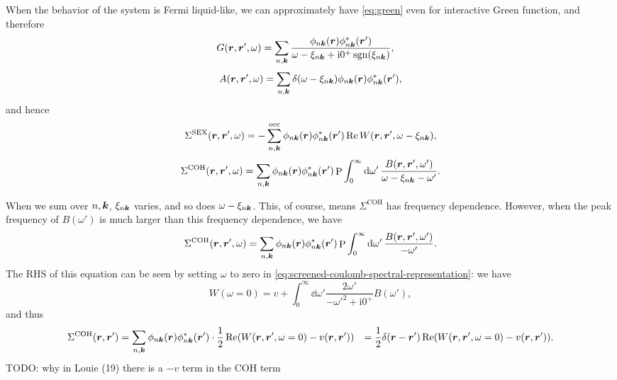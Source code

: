 \documentclass[hyperref, a4paper, 12pt]{report}
\DeclareMathOperator{\primevalue}{P}
\DeclareMathOperator{\sgn}{sgn}
\newcommand*{\ii}{\mathrm{i}}
\def\\{}%
\begin{document}
When the behavior of the system is Fermi liquid-like, 
we can approximately have \eqref{eq:green} even for interactive Green function,
and therefore 
\begin{equation}
    G(\vb*{r}, \vb*{r}', \omega)
    = \sum_{n, \vb*{k}} \frac{
        \phi_{n \vb*{k}}(\vb*{r}) \phi^*_{n \vb*{k}}(\vb*{r}')
    }{
        \omega - \xi_{n \vb*{k}} + \ii 0^+ \sgn(\xi_{n \vb*{k}})
    }, \quad 
\end{equation}
\begin{equation}
    A(\vb*{r}, \vb*{r}', \omega)
    = \sum_{n, \vb*{k}} \delta(\omega - \xi_{n \vb*{k}})
    \phi_{n \vb*{k}}(\vb*{r}) \phi^*_{n \vb*{k}}(\vb*{r}'),
\end{equation}
and hence 
\begin{equation}
    \Sigma^{\text{SEX}}(\vb*{r}, \vb*{r}', \omega)
    = - \sum_{n, \vb*{k}}^{\text{occ}}
    \phi_{n \vb*{k}}(\vb*{r}) \phi_{n \vb*{k}}^*(\vb*{r}') 
    \Re W(\vb*{r}, \vb*{r}', \omega - \xi_{n \vb*{k}}), 
    \label{eq:sigma-sex-fermi-liquid}
\end{equation}
\begin{equation}
    \Sigma^{\text{COH}}(\vb*{r}, \vb*{r}', \omega)
    = \sum_{n, \vb*{k}} \phi_{n \vb*{k}}(\vb*{r}) \phi_{n \vb*{k}}^*(\vb*{r}')
    \primevalue \int_{0}^{\infty} \dd{\omega'}
    \frac{B(\vb*{r}, \vb*{r}', \omega')}{\omega - \xi_{n \vb*{k}} - \omega'}.
\end{equation}



When we sum over $n, \vb*{k}$,
$\xi_{n \vb*{k}}$ varies, 
and so does $\omega - \xi_{n \vb*{k}}$.
This, of course, means $\Sigma^{\text{COH}}$ has frequency dependence.
However, when the peak frequency of $B(\omega')$ 
is much larger than this frequency dependence,
we have 
\[
    \Sigma^{\text{COH}}(\vb*{r}, \vb*{r}', \omega)
    = \sum_{n, \vb*{k}} \phi_{n \vb*{k}}(\vb*{r}) \phi_{n \vb*{k}}^*(\vb*{r}')
    \primevalue \int_{0}^{\infty} \dd{\omega'}
    \frac{B(\vb*{r}, \vb*{r}', \omega')}{- \omega'}.
\]
The RHS of this equation can be seen by setting $\omega$ to zero in 
\eqref{eq:screened-coulomb-spectral-representation}:
we have 
\[
    W(\omega = 0) = v + \int_{0}^{\infty} \dd{\omega'} \frac{2 \omega'}{- \omega'^2 + \ii 0^+} B(\omega'),
\]
and thus 
\begin{equation}
    \begin{aligned}
        \Sigma^{\text{COH}}(\vb*{r}, \vb*{r}')
        &= \sum_{n, \vb*{k}} \phi_{n \vb*{k}}(\vb*{r}) \phi_{n \vb*{k}}^*(\vb*{r}') \cdot 
        \frac{1}{2} \Re (W(\vb*{r}, \vb*{r}', \omega = 0) - v(\vb*{r}, \vb*{r}')) \\
        &= \frac{1}{2} \delta(\vb*{r} - \vb*{r}') 
        \Re (W(\vb*{r}, \vb*{r}', \omega = 0) - v(\vb*{r}, \vb*{r}')) .
    \end{aligned}
\end{equation}
TODO: why in Louie (19) there is a $-v$ term in the COH term 
\end{document}
